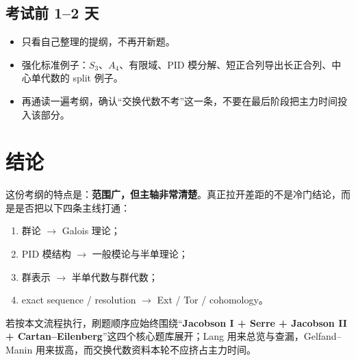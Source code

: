 \documentclass[12pt,a4paper]{ctexart}
\begin{document}
\subsection{考试前 1--2 天}

\begin{itemize}
  \item 只看自己整理的提纲，不再开新题。
  \item 强化标准例子：\(S_3\)、\(A_4\)、有限域、PID 模分解、短正合列导出长正合列、中心单代数的 split 例子。
  \item 再通读一遍考纲，确认“交换代数不考”这一条，不要在最后阶段把主力时间投入该部分。
\end{itemize}

\section{结论}

这份考纲的特点是：\textbf{范围广，但主轴非常清楚}。真正拉开差距的不是冷门结论，而是是否把以下四条主线打通：
\begin{enumerate}
  \item 群论 \( \to \) Galois 理论；
  \item PID 模结构 \( \to \) 一般模论与半单理论；
  \item 群表示 \( \to \) 半单代数与群代数；
  \item exact sequence / resolution \( \to \) Ext / Tor / cohomology。
\end{enumerate}

若按本文流程执行，刷题顺序应始终围绕“\textbf{Jacobson I + Serre + Jacobson II + Cartan--Eilenberg}”这四个核心题库展开；Lang 用来总览与查漏，Gelfand--Manin 用来拔高，而交换代数资料本轮不应挤占主力时间。
\end{document}
